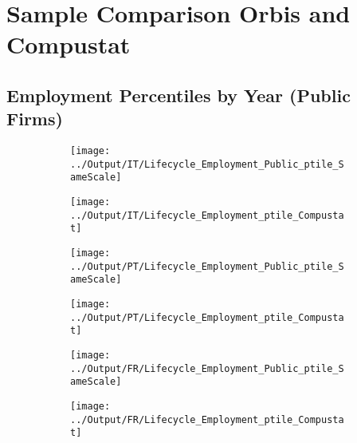 \documentclass[12pt,notitlepage]{article}
\begin{document}


\FloatBarrier
\section{Sample Comparison Orbis and Compustat} %
\label{sec:compustat_vs_orbis}
\FloatBarrier

\subsection{Employment Percentiles by Year (Public Firms)}

\begin{figure}[!htpb]
\centering
\begin{subfigure}{.49\textwidth}
    \centering
 \texttt{[image: ../Output/IT/Lifecycle\_Employment\_Public\_ptile\_SameScale]}
\end{subfigure}%
\begin{subfigure}{.49\textwidth}
    \centering
 \texttt{[image: ../Output/IT/Lifecycle\_Employment\_ptile\_Compustat]}
\end{subfigure}
\begin{subfigure}{.49\textwidth}
    \centering
 \texttt{[image: ../Output/PT/Lifecycle\_Employment\_Public\_ptile\_SameScale]}
\end{subfigure}%
\begin{subfigure}{.49\textwidth}
    \centering
 \texttt{[image: ../Output/PT/Lifecycle\_Employment\_ptile\_Compustat]}
\end{subfigure}
\begin{subfigure}{.49\textwidth}
    \centering
 \texttt{[image: ../Output/FR/Lifecycle\_Employment\_Public\_ptile\_SameScale]}
\end{subfigure}%
\begin{subfigure}{.49\textwidth}
    \centering
 \texttt{[image: ../Output/FR/Lifecycle\_Employment\_ptile\_Compustat]}
\end{subfigure}
\end{figure}
\pagebreak
\end{document}

